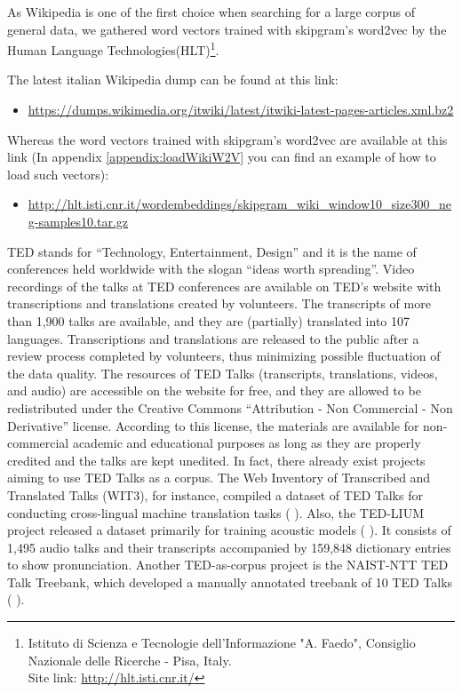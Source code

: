 As Wikipedia is one of the first choice when searching for a large corpus of general data, we gathered word vectors trained with skipgram's word2vec by the
Human Language Technologies(HLT)\footnote{Istituto di Scienza e Tecnologie dell'Informazione "A. Faedo", Consiglio Nazionale delle Ricerche - Pisa, Italy.\\Site link:  \url{http://hlt.isti.cnr.it/}}.


The latest italian Wikipedia dump can be found at this link:
\begin{itemize}
	\item \url{https://dumps.wikimedia.org/itwiki/latest/itwiki-latest-pages-articles.xml.bz2}
\end{itemize}
Whereas the word vectors trained with skipgram's word2vec are available at this link (In appendix \ref{appendix:loadWikiW2V} you can find an example of how to load such vectors):
\begin{itemize}
	\item \url{http://hlt.isti.cnr.it/wordembeddings/skipgram_wiki_window10_size300_neg-samples10.tar.gz}
\end{itemize}




TED stands for “Technology, Entertainment, Design” and it is the name of conferences held worldwide with the slogan “ideas worth spreading”. Video recordings of the talks at TED conferences are available on TED’s website with transcriptions and translations created by volunteers. The transcripts of more than 1,900 talks are available, and they are (partially) translated into 107 languages. Transcriptions and translations are released to the public after a review process completed by volunteers, thus minimizing possible fluctuation of the data quality.
The resources of TED Talks (transcripts, translations, videos, and audio) are accessible on the website for free, and they are allowed to be redistributed under the Creative Commons “Attribution - Non Commercial - Non Derivative” license. According to this license, the materials are available for non-commercial academic and
educational purposes as long as they are properly credited and the talks are kept unedited.
In fact, there already exist projects aiming to use TED Talks as a corpus. The Web Inventory of Transcribed and Translated Talks (WIT3), for instance, compiled a dataset of TED Talks for conducting cross-lingual machine translation tasks (\citeauthor{mauro2012wit3} \citeyear{mauro2012wit3} \cite{mauro2012wit3}). Also, the TED-LIUM project released a dataset primarily for training acoustic models (\citeauthor{rousseau2014enhancing} \citeyear{rousseau2014enhancing} \cite{rousseau2014enhancing}). It consists of 1,495 audio talks and their transcripts accompanied by 159,848 dictionary entries to show pronunciation. Another TED-as-corpus project is the NAIST-NTT TED Talk Treebank, which developed a manually annotated treebank of 10 TED Talks (\citeauthor{neubig2014naist} \citeyear{neubig2014naist} \cite{neubig2014naist}).



